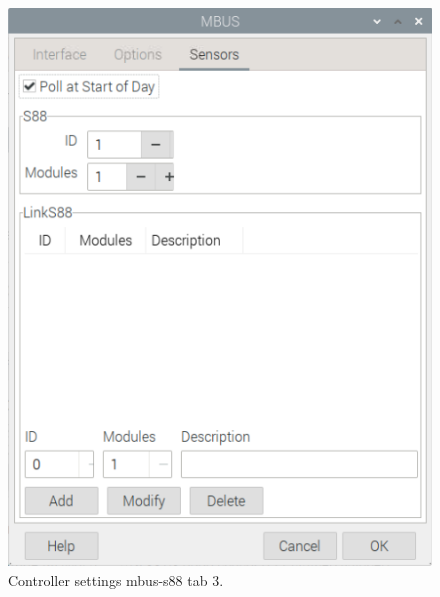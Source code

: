 \begin{figure}[h!]
	\centering
	\includegraphics[width=1.00\linewidth]{../figures/rocrailcontrollersettings/S88N_settings_tab3.png}
	\caption{Controller settings mbus-s88 tab 3.}
	\label{fig:S88N_settings_tab3}
\end{figure}
